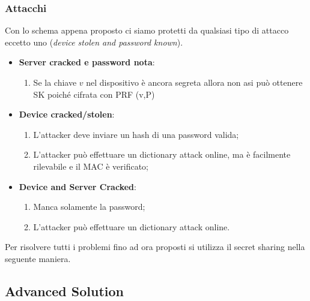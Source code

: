 \documentclass{book}
\begin{document}
\subsubsection{Attacchi}
Con lo schema appena proposto ci siamo protetti da qualsiasi tipo di attacco eccetto uno (\emph{device stolen and password known}).\begin{itemize}
    \item \textbf{Server cracked e password nota}:\begin{enumerate}
        \item Se la chiave \(v\) nel dispositivo è ancora segreta allora non asi può ottenere SK poiché cifrata con PRF (v,P)
    \end{enumerate}
    \item \textbf{Device cracked/stolen}:\begin{enumerate}
        \item L'attacker deve inviare un hash di una password valida;
        \item L'attacker può effettuare un dictionary attack online, ma è facilmente rilevabile e il MAC è verificato;
    \end{enumerate}
    \item \textbf{Device and Server Cracked}:\begin{enumerate}
        \item Manca solamente la password;
        \item L'attacker può effettuare un dictionary attack online.
    \end{enumerate}
\end{itemize}
Per risolvere tutti i problemi fino ad ora proposti si utilizza il secret sharing nella seguente maniera.
\newpage
\subsection{Advanced Solution}
\end{document}
